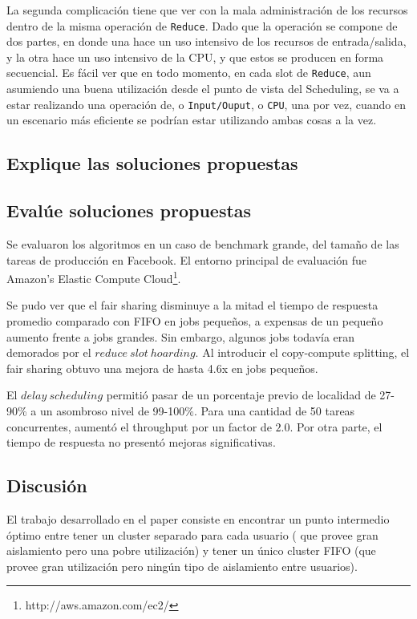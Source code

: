 \documentclass[11pt, a4paper, twoside]{article}
\begin{document}
La segunda complicación tiene que ver con la mala administración de los recursos
dentro de la misma operación de \texttt{Reduce}. Dado que la operación se
compone de dos partes, en donde una hace un uso intensivo de los recursos de
entrada/salida, y la otra hace un uso intensivo de la CPU, y que estos se
producen en forma secuencial. Es fácil ver que en todo momento, en cada slot de
\texttt{Reduce}, aun asumiendo una buena utilización desde el punto de vista del
Scheduling, se va a estar realizando una operación de, o \texttt{Input/Ouput}, o
\texttt{CPU}, una por vez, cuando en un escenario más eficiente se podrían estar
utilizando ambas cosas a la vez.

\clearpage
\subsection {\footnotesize Explique las soluciones propuestas}
\label{investigacion-6}

\clearpage
\subsection {\footnotesize Evalúe soluciones propuestas}
\label{investigacion-7}

Se evaluaron los algoritmos en un caso de benchmark grande, del tamaño de las tareas de producción en Facebook. El entorno principal de evaluación fue Amazon's Elastic Compute Cloud\footnote{http://aws.amazon.com/ec2/}.

Se pudo ver que el fair sharing disminuye a la mitad el tiempo de respuesta promedio comparado con FIFO en jobs pequeños, a expensas de un pequeño aumento frente a jobs grandes. Sin embargo, algunos jobs todavía eran demorados por el $reduce\ slot\ hoarding$. Al introducir el copy-compute splitting, el fair sharing obtuvo una mejora de hasta 4.6x en jobs pequeños.

El $delay\ scheduling$ permitió pasar de un porcentaje previo de localidad de 27-90\% a un asombroso nivel de 99-100\%. Para una cantidad de 50 tareas concurrentes, aumentó el throughput por un factor de $2.0$. Por otra parte, el tiempo de respuesta no presentó mejoras significativas.

\clearpage
\subsection {\footnotesize Discusión}
\label{investigacion-8}

El trabajo desarrollado en el paper consiste en encontrar un punto
intermedio óptimo entre tener un cluster separado para cada usuario (
que provee gran aislamiento pero una pobre utilización) y tener un único
cluster FIFO (que provee gran utilización pero ningún tipo de
aislamiento entre usuarios).
\end{document}
